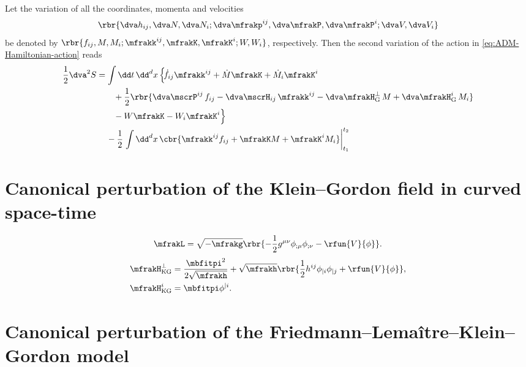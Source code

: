 \documentclass[a4paper,11pt]{article}
\begin{document}
Let the variation of all the coordinates, momenta and velocities
\[\rbr{\dva h_{ij}, \dva N, \dva N_i; \dva\mfrakp^{ij}, \dva\mfrakP, 
\dva\mfrakP^i; \dva V, \dva V_i}\]
be denoted by
$\rbr{f_{ij}, M, M_i; \mfrakk^{ij}, \mfrakK, \mfrakK^i; W, W_i}$, respectively. 
Then the second variation of the action in \cref{eq:ADM-Hamiltonian-action} 
reads
\begin{align}
\frac{1}{2} \dva^2 S &= \int \dd t\,\dd^d x\,\Big\{\!
\dot f_{ij} \mfrakk^{ij} +\dot M \mfrakK+ \dot{M}_i \mfrakK^i
\nonumber \\
&\qquad
+\frac{1}{2}\rbr{
\dva\mscrP^{ij} \, f_{ij}
-\dva\mscrH_{ij} \, \mfrakk^{ij}
-\dva\mfrakH^\perp_\text{G} \, M
+\dva\mfrakH^i_\text{G} \, M_i}
\nonumber \\
&\qquad
-W \mfrakK - W_i \mfrakK^i \Big\}
\nonumber \\
&\quad\,
-\frac{1}{2}\left.\int\dd^d x\,
\cbr{\mfrakk^{ij} f_{ij} + \mfrakK M + \mfrakK^i M_i}\right|_{t_1}^{t_2}
\end{align}


\section{Canonical perturbation of the Klein--Gordon field in curved space-time}


\begin{align}
\mfrakL = \sqrt{-\mfrakg}\rbr{-\frac{1}{2}g^{\mu\nu}\phi_{;\mu}\phi_{;\nu}
-\rfun{V}{\phi}}.
\end{align}
\cite[ch.\ 4.2.2]{Kiefer2012}
\begin{align}
\mfrakH^\perp_\text{KG} &= \frac{\mbfitpi^2}{2\sqrt{\mfrakh}} + \sqrt{\mfrakh}
\rbr{\frac{1}{2}h^{ij}\phi_{|i}\phi_{|j}+\rfun{V}{\phi}},\\
\mfrakH^i_\text{KG} &= \mbfitpi \phi^{|i}.
\end{align}





\section{Canonical perturbation of the Friedmann--Lema\^itre--Klein--Gordon 
model}
\end{document}
